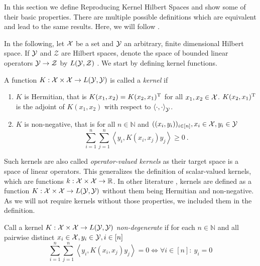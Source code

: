 In this section we define Reproducing Kernel Hilbert Spaces and show some of their basic properties.
There are multiple possible definitions which are equivalent and lead to the same results.
Here, we will follow \cite{owhadi20}.


In the following, let $\mathcal{X}$ be a set and $\mathcal{Y}$ an arbitrary, finite dimensional Hilbert space.
If $\mathcal{Y}$ and $\mathcal{Z}$ are Hilbert spaces, denote the space of bounded linear operators $\mathcal{Y} \rightarrow \mathcal{Z}$ by $L(\mathcal{Y}, \mathcal{Z})$ .
We start by defining kernel functions.
\begin{definition}
	\label{def:kernel}
	A function $K: \mathcal{X} \times \mathcal{X} \rightarrow L(\mathcal{Y}, \mathcal{Y})$ is called a \emph{kernel} if
	\begin{enumerate}
		\item $K$ is Hermitian, that is $K(x_1, x_2) = K(x_2, x_1)^{\mathrm{T}}$ for all $x_1, x_2 \in \mathcal{X}$. 
		$K(x_2, x_1)^{\mathrm{T}}$ is the adjoint of $K(x_1, x_2)$ with respect to $\left<\cdot, \cdot\right>_{\mathcal{Y}}$.
		\item $K$ is non-negative, that is for all $n \in \mathbb{N}$ and $((x_i, y_i))_{i \in [n]}, x_i \in \mathcal{X}, y_i \in \mathcal{Y}$
		\begin{equation}
			\sum_{i=1}^n \sum_{j=1}^n \left< y_i, K(x_i, x_j)  y_j\right> \geq 0 \ .
		\end{equation}
	\end{enumerate}
\end{definition}

Such kernels are also called \emph{operator-valued kernels} as their target space is a space of linear operators.
This generalizes the definition of scalar-valued kernels, which are functions $k: \mathcal{X} \times \mathcal{X} \rightarrow \mathbb{R}$.
In other literature \cite{sejdinovic12}, kernels are defined as a function $K: \mathcal{X} \times \mathcal{X} \rightarrow L(\mathcal{Y}, \mathcal{Y})$ without them being Hermitian and non-negative.
As we will not require kernels without those properties, we included them in the definition.

\begin{definition}
	Call a kernel $K: \mathcal{X} \times \mathcal{X} \rightarrow L(\mathcal{Y}, \mathcal{Y})$ \emph{non-degenerate} if for each $n \in \mathbb{N}$ and all pairwise distinct $x_i \in \mathcal{X}, y_i \in \mathcal{Y}, i \in [n]$
	\begin{equation}
		\sum_{i=1}^n \sum_{j=1}^n \left< y_i, K(x_i, x_j)  y_j\right> = 0 \Leftrightarrow \forall i \in [n]:~ y_i = 0
	\end{equation}
\end{definition}

